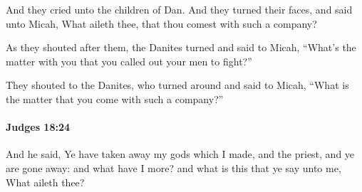 			\begin{versebox}
					\item[BHS] 
					\item[ASV] And they cried unto the children of Dan. And they turned their faces, and said unto Micah, What aileth thee, that thou comest with such a company?
					\item[NIV] As they shouted after them, the Danites turned and said to Micah, “What’s the matter with you that you called out your men to fight?”
					\item[NRSV] They shouted to the Danites, who turned around and said to Micah, “What is the matter that you come with such a company?”
			\end{versebox}

		\paragraph{Judges 18:24} %
			\label{JUDGES-18-24}

			And he said, Ye have taken away my gods which I made, and the priest, and ye are gone away: and what have I more? and what is this that ye say unto me, What aileth thee?

